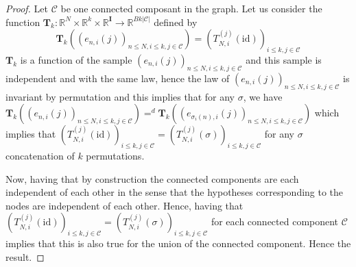 \documentclass{article}
\theoremstyle{plain}
\theoremstyle{remark}
\newcommand{\R}{\mathbb{R}}
\newcommand{\1}{\mathbbm{1}}
\newcommand{\id}{\mathrm{id}}
\numberwithin{equation}{section}
\begin{document}
\begin{proof}
Let $\mathcal{C}$ be one connected composant in the graph. Let us consider the function $\textbf{T}_k : \R^{N}\times\R^k\times\R^{\textbf{I}}\to \R^{Bk|\mathcal{C}|}$ defined by $$\textbf{T}_k\left((e_{n,i}(j))_{n\le N, i\le k,j\in \mathcal{C}}\right) =(T_{N,i}^{(j)}(\id))_{i\le k, j \in \mathcal{C}}$$
$\textbf{T}_k$ is a function of the sample $(e_{n,i}(j))_{n\le N, i\le k,j\in \mathcal{C}}$ and this sample is independent and with the same law, hence the law of $(e_{n,i}(j))_{n\le N, i\le k,j\in \mathcal{C}}$ is invariant by permutation and this implies that for any $\sigma$, we have $\textbf{T}_k\left((e_{n,i}(j))_{n\le N, i\le k,j\in \mathcal{C}}\right) =^d \textbf{T}_k\left((e_{\sigma_i(n),i}(j))_{n\le N, i\le k,j\in \mathcal{C}}\right)$ which implies that $(T_{N,i}^{(j)}(\id))_{i\le k, j \in \mathcal{C}}=(T_{N,i}^{(j)}(\sigma))_{i\le k, j \in \mathcal{C}}$ for any $\sigma$ concatenation of $k$ permutations.

Now, having that by construction the connected components are each independent of each other in the sense that the hypotheses corresponding to the nodes are independent of each other. Hence, having that $(T_{N,i}^{(j)}(\id))_{i\le k, j \in \mathcal{C}}=(T_{N,i}^{(j)}(\sigma))_{i\le k, j \in \mathcal{C}}$ for each connected component $\mathcal{C}$ implies that this is also true for the union of the connected component. Hence the result.

\end{proof}
\end{document}
